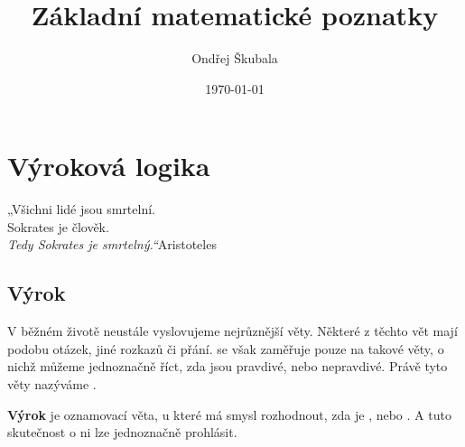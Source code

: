 \documentclass[12pt,a4paper]{article}
\title{Základní matematické poznatky}
\author{Ondřej Škubala}
\date{\today}
\begin{document}
\maketitle
\newpage



\section{Výroková logika}

\begin{quotebox}{„Všichni lidé jsou smrtelní.\\
Sokrates je člověk.\\
\emph{Tedy Sokrates je smrtelný.“}}{Aristoteles}
\end{quotebox}

\subsection{Výrok}

V běžném životě neustále vyslovujeme nejrůznější věty. Některé z těchto vět mají podobu otázek, jiné rozkazů či přání.  
 se však zaměřuje pouze na takové věty, o nichž můžeme jednoznačně říct, zda jsou pravdivé, nebo nepravdivé.  
Právě tyto věty nazýváme .

\begin{definitionbox}
\textbf{Výrok} je oznamovací věta, u které má smysl rozhodnout, zda je , nebo .  
A tuto skutečnost o ni lze jednoznačně prohlásit.
\end{definitionbox}
\end{document}
